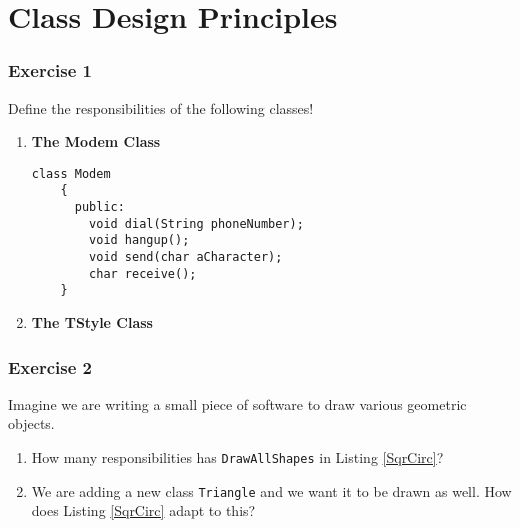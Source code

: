 \documentclass[14pt,a4paper]{article}
\begin{document}
\part*{Class Design Principles}
\label{part:all}

 
\section*{Exercise 1}
\large
Define the responsibilities of the following classes!\\
 \begin{enumerate}
\item \large \textbf{The Modem Class}\\
  \small
  \begin{lstlisting}[float=ht,caption={\large \textbf{The Modem Class}}]
    class Modem
    {
      public:
        void dial(String phoneNumber);
        void hangup();
        void send(char aCharacter);
        char receive();
    }
  \end{lstlisting}
  
\newpage
\item \large \textbf{The TStyle Class}\\
  \small 
  \normalsize
\end{enumerate}

\newpage
\section*{Exercise 2}
Imagine we are writing a small piece of software to draw various geometric objects.\\
\small
 
\normalsize
\begin{enumerate}
\item How many responsibilities has \texttt{DrawAllShapes} in Listing \ref{SqrCirc}?
\item We are adding a new class \texttt{Triangle} and we want it to be drawn as well. How does Listing \ref{SqrCirc} adapt to this?
\end{enumerate}

\newpage
\end{document}
